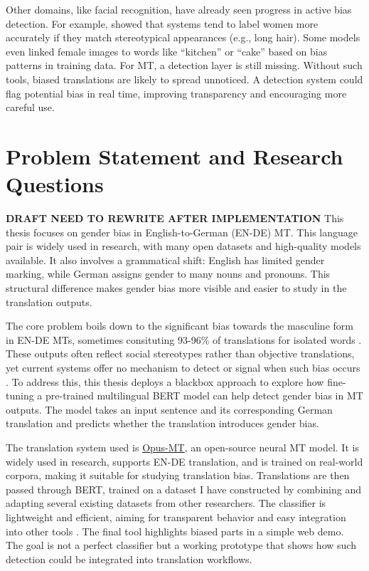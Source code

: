 Other domains, like facial recognition, have already seen progress in active bias detection. For example, \citet{schwemmerDiagnosingGenderBias2020} showed that systems tend to label women more accurately if they match stereotypical appearances (e.g., long hair). Some models even linked female images to words like “kitchen” or “cake” based on bias patterns in training data. For MT, a detection layer is still missing. Without such tools, biased translations are likely to spread unnoticed. A detection system could flag potential bias in real time, improving transparency and encouraging more careful use.

\section{Problem Statement and Research Questions}
\textbf{DRAFT NEED TO REWRITE AFTER IMPLEMENTATION}
This thesis focuses on gender bias in English-to-German (EN-DE) MT. This language pair is widely used in research, with many open datasets and high-quality models available. It also involves a grammatical shift: English has limited gender marking, while German assigns gender to many nouns and pronouns. This structural difference makes gender bias more visible and easier to study in the translation outputs.

The core problem boils down to the significant bias towards the masculine form in EN-DE MTs, sometimes consituting 93-96\% of translations for isolated words \citep{lardelliBuildingBridgesDataset2024}. These outputs often reflect social stereotypes rather than objective translations, yet current systems offer no mechanism to detect or signal when such bias occurs \citep{rescignoGenderBiasMachine2023}. To address this, this thesis deploys a blackbox approach to explore how fine-tuning a pre-trained multilingual BERT model can help detect gender bias in MT outputs. The model takes an input sentence and its corresponding German translation and predicts whether the translation introduces gender bias. 

The translation system used is \href{https://github.com/Helsinki-NLP/Opus-MT?tab=readme-ov-file}{Opus-MT}, an open-source neural MT model. It is widely used in research, supports EN-DE translation, and is trained on real-world corpora, making it suitable for studying translation bias. Translations are then passed through BERT, trained on a dataset I have constructed by combining and adapting several existing datasets from other researchers. The classifier is lightweight and efficient, aiming for transparent behavior and easy integration into other tools \citep{devlinBERTPretrainingDeep2019}. The final tool highlights biased parts in a simple web demo. The goal is not a perfect classifier but a working prototype that shows how such detection could be integrated into translation workflows.

